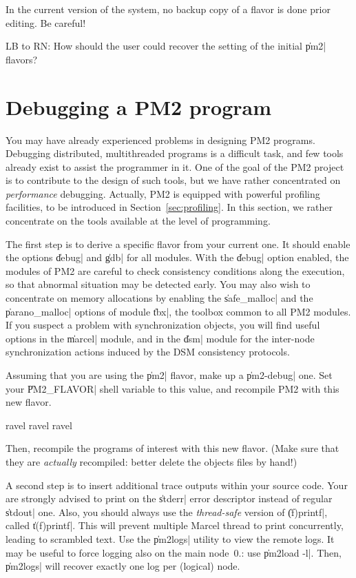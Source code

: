 \begin{warning}
  In the current version of the system, no backup copy of a flavor is
  done prior editing. Be careful! 
\end{warning}

\begin{note}
  LB to RN: How should the user could recover the setting of the
  initial \|pm2| flavors?
\end{note}


\section{Debugging a PM2 program}

You may have already experienced problems in designing PM2 programs.
Debugging distributed, multithreaded programs is a difficult task, and
few tools already exist to assist the programmer in it. One of the
goal of the PM2 project is to contribute to the design of such tools,
but we have rather concentrated on \emph{performance} debugging.
Actually, PM2 is equipped with powerful profiling facilities, to be
introduced in Section~\ref{sec:profiling}. In this section, we rather
concentrate on the tools available at the level of programming.

The first step is to derive a specific flavor from your current one.
It should enable the options \|debug| and \|gdb| for all modules. With
the \|debug| option enabled, the modules of PM2 are careful to check
consistency conditions along the execution, so that abnormal situation
may be detected early. You may also wish to concentrate on memory
allocations by enabling the \|safe_malloc| and the \|parano_malloc|
options of module \|tbx|, the toolbox common to all PM2 modules. If
you suspect a problem with synchronization objects, you will find
useful options in the \|marcel| module, and in the \|dsm| module for
the inter-node synchronization actions induced by the DSM consistency
protocols.

Assuming that you are using the \|pm2| flavor, make up a
\|pm2-debug| one. Set your \|PM2_FLAVOR| shell variable to this value,
and recompile PM2 with this new flavor. 
\begin{shell}
ravel%
ravel%
ravel%
\end{shell}
Then, recompile the programs of interest with this new flavor. (Make
sure that they are \emph{actually} recompiled: better delete the
objects files by hand!) 

A second step is to insert additional trace outputs within your source
code. Your are strongly advised to print on the \|stderr| error
descriptor instead of regular \|stdout| one. Also, you should always
use the \emph{thread-safe} version of \|(f)printf|, called \|t(f)printf|.
This will prevent multiple Marcel thread to print concurrently,
leading to scrambled text. Use the \|pm2logs| utility to view the
remote logs. It may be useful to force logging also on the main
node~0.: use \|pm2load -l|. Then, \|pm2logs| will recover exactly one
log per (logical) node.

